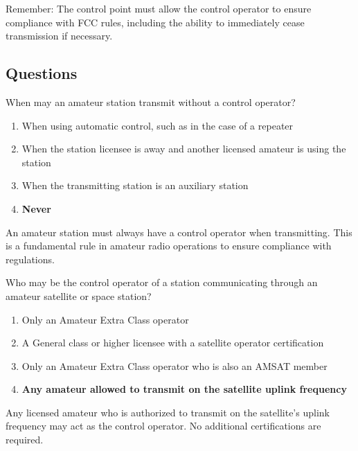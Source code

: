 Remember: The control point must allow the control operator to ensure compliance with FCC rules, including the ability to immediately cease transmission if necessary.

\subsection*{Questions}
\begin{tcolorbox}[colback=gray!10!white,colframe=black!75!black,title={T1E01}]
When may an amateur station transmit without a control operator?
\begin{enumerate}[label=\Alph*),noitemsep]
    \item When using automatic control, such as in the case of a repeater
    \item When the station licensee is away and another licensed amateur is using the station
    \item When the transmitting station is an auxiliary station
    \item \textbf{Never}
\end{enumerate}
\end{tcolorbox}
An amateur station must always have a control operator when transmitting. This is a fundamental rule in amateur radio operations to ensure compliance with regulations.


\begin{tcolorbox}[colback=gray!10!white,colframe=black!75!black,title={T1E02}]
Who may be the control operator of a station communicating through an amateur satellite or space station?
\begin{enumerate}[label=\Alph*),noitemsep]
    \item Only an Amateur Extra Class operator
    \item A General class or higher licensee with a satellite operator certification
    \item Only an Amateur Extra Class operator who is also an AMSAT member
    \item \textbf{Any amateur allowed to transmit on the satellite uplink frequency}
\end{enumerate}
\end{tcolorbox}
Any licensed amateur who is authorized to transmit on the satellite's uplink frequency may act as the control operator. No additional certifications are required.



